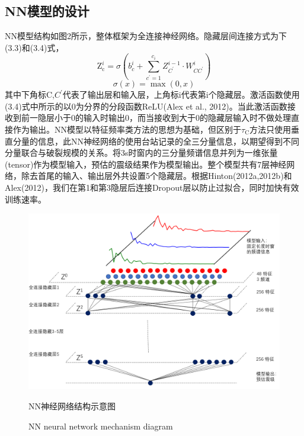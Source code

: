 \subsection{NN模型的设计}
\indent NN模型结构如图2所示，整体框架为全连接神经网络。隐藏层间连接方式为下(3.3)和(3.4)式，
\begin{equation}
\mathrm{Z}_{\mathrm{c}}^{i}=\sigma\left(b_{c}^{i}+\sum_{c^{\prime}=1}^{c_{i}} Z_{C^{\prime}}^{i-1} \cdot W_{C C^{\prime}}^{i}\right)
\end{equation}
\begin{equation}
\sigma(x)=\max (0, x)
\end{equation}
其中下角标C,$C^{\prime}$代表了输出层和输入层，上角标i代表第i个隐藏层。激活函数使用(3.4)式中所示的以0为分界的分段函数ReLU(Alex et al., 2012)。当此激活函数接收到前一隐层小于0的输入时输出0，而当接收到大于0的隐藏层输入时不做处理直接作为输出。NN模型以特征频率类方法的思想为基础，但区别于$\tau_{\mathrm{C}}$方法只使用垂直分量的信息，此NN神经网络的使用台站记录的全三分量信息，以期望得到不同分量联合与破裂规模的关系。将3s时窗内的三分量频谱信息并列为一维张量(tensor)作为模型输入，预估的震级结果作为模型输出。整个模型共有7层神经网络，除去首尾的输入、输出层外共设置5个隐藏层。根据Hinton(2012a,2012b)和Alex(2012)，我们在第1和第3隐层后连接Dropout层以防止过拟合，同时加快有效训练速率。\\
\begin{figure}[!h] 
\centering 
 \includegraphics[width=0.99\linewidth]{img/NN.png} 
 \renewcommand{\figurename}{图} 
\caption{NN神经网络结构示意图} 
\addtocounter{figure}{-1} \vspace{-5pt} 
\renewcommand{\figurename}{Fig} 
\caption{NN neural network mechanism diagram} 
\renewcommand{\figurename}{图} 
\label{fig:network-device-influence.png} 
\end{figure}

